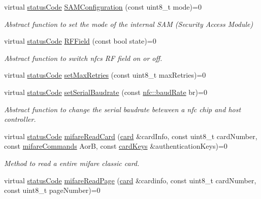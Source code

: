 \begin{DoxyCompactItemize}
virtual \hyperlink{declarations_8h_ae1d20c5a38cae82ccaa6a77be3fd264b}{status\+Code} \hyperlink{classnfc_1_1NFC_ab4dc91843bbd93211aa0f086e93b8608}{S\+A\+M\+Configuration} (const uint8\+\_\+t mode)=0
\begin{DoxyCompactList}\small\item\em Abstract function to set the mode of the internal S\+AM (Security Access Module) \end{DoxyCompactList}\item 
virtual \hyperlink{declarations_8h_ae1d20c5a38cae82ccaa6a77be3fd264b}{status\+Code} \hyperlink{classnfc_1_1NFC_a1179f5330aa9092aff8b1d6f984bc621}{R\+F\+Field} (const bool state)=0
\begin{DoxyCompactList}\small\item\em Abstract function to switch nfc\textquotesingle{}s RF field on or off. \end{DoxyCompactList}\item 
virtual \hyperlink{declarations_8h_ae1d20c5a38cae82ccaa6a77be3fd264b}{status\+Code} \hyperlink{classnfc_1_1NFC_a9dd84363c873a5d00c7edce644706bc0}{set\+Max\+Retries} (const uint8\+\_\+t max\+Retries)=0
\item 
virtual \hyperlink{declarations_8h_ae1d20c5a38cae82ccaa6a77be3fd264b}{status\+Code} \hyperlink{classnfc_1_1NFC_a1657b79a7ca710e01cf053ab269949ba}{set\+Serial\+Baudrate} (const \hyperlink{declarations_8h_a18236cb00569a8f612f8957044868f74}{nfc\+::baud\+Rate} br)=0
\begin{DoxyCompactList}\small\item\em Abstract function to change the serial baudrate beteween a nfc chip and host controller. \end{DoxyCompactList}\item 
virtual \hyperlink{declarations_8h_ae1d20c5a38cae82ccaa6a77be3fd264b}{status\+Code} \hyperlink{classnfc_1_1NFC_af9089f7662b5c41791c1acac197dc843}{mifare\+Read\+Card} (\hyperlink{classcard}{card} \&card\+Info, const uint8\+\_\+t card\+Number, const \hyperlink{declarations_8h_a305b1a3bcfca65e2a82f0f9d24676835}{mifare\+Commands} AorB, const \hyperlink{structnfc_1_1cardKeys}{card\+Keys} \&authentication\+Keys)=0
\begin{DoxyCompactList}\small\item\em Method to read a entire mifare classic card. \end{DoxyCompactList}\item 
virtual \hyperlink{declarations_8h_ae1d20c5a38cae82ccaa6a77be3fd264b}{status\+Code} \hyperlink{classnfc_1_1NFC_adb0cc22d46e5a97d0b991891998578c6}{mifare\+Read\+Page} (\hyperlink{classcard}{card} \&cardinfo, const uint8\+\_\+t card\+Number, const uint8\+\_\+t page\+Number)=0

\end{DoxyCompactItemize}
